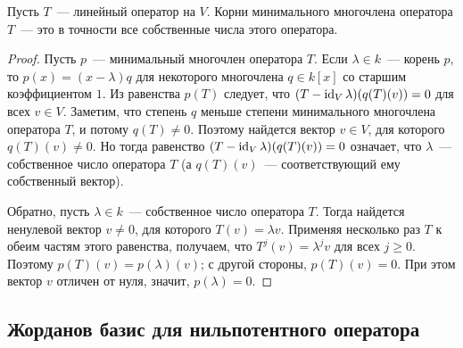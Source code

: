 \begin{proposition}\label{prop:roots-of-minuimal-are-eigenvalues}
Пусть $T$~--- линейный оператор на $V$. Корни минимального многочлена
оператора $T$~--- это в точности все собственные числа этого оператора.
\end{proposition}
\begin{proof}
Пусть $p$~--- минимальный многочлен оператора $T$.
Если $\lambda\in k$~--- корень $p$, то $p(x) = (x-\lambda)q$
для некоторого многочлена $q\in k[x]$ со старшим коэффициентом $1$.
Из равенства $p(T)$ следует, что
$(T-\operatorname{id}_V\lambda)(q(T)(v))=0$ для всех $v\in V$.
Заметим, что степень $q$ меньше степени минимального многочлена оператора $T$,
и потому $q(T)\neq 0$. Поэтому найдется вектор $v\in V$, для которого
$q(T)(v)\neq 0$. Но тогда равенство $(T-\operatorname{id}_V\lambda)(q(T)(v))=0$ означает,
что $\lambda$~--- собственное число оператора $T$ (а $q(T)(v)$~---
соответствующий ему собственный вектор).

Обратно, пусть $\lambda\in k$~--- собственное число оператора $T$.
Тогда найдется ненулевой вектор $v\neq 0$, для которого
$T(v) = \lambda v$. Применяя несколько раз $T$ к обеим частям этого равенства,
получаем, что $T^j(v) = \lambda^j v$ для всех $j\geq 0$.
Поэтому $p(T)(v)= p(\lambda)(v)$; с другой стороны, $p(T)(v)=0$.
При этом вектор $v$ отличен от нуля, значит, $p(\lambda)=0$.
\end{proof}

\subsection{Жорданов базис для нильпотентного оператора}


